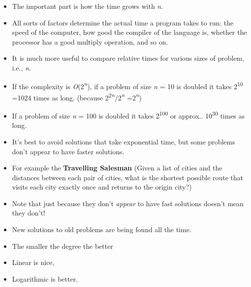 \documentclass{beamer}
\begin{document}
\begin{frame}
\begin{itemize}
\item The important part is how the time grows with \textit{n}.
\item All sorts of factors determine the actual time a program takes to run: the speed of the computer, how good the
compiler of the language is, whether the processor has a good multiply operation, and so on.
\item It is much more useful to compare relative times for various sizes of problem, i.e., \textit{n}.
\item If the complexity is \textit{O}(2\textit{\textsuperscript{n}}), if a problem of size \textit{n }= 10 is doubled it takes 2\textsuperscript{10 }=1024 times as long. 
(because 2\textsuperscript{2}\textit{\textsuperscript{n}}/2\textit{\textsuperscript{n }}=2\textit{\textsuperscript{n}})  
\item If a problem of size \textit{n }= 100 is doubled it takes 2\textsuperscript{100 }or approx.. 10\textsuperscript{30
}times as long.
\end{itemize}
\end{frame} 

\begin{frame}
\begin{itemize}
\item It's best to avoid solutions that take exponential time, but some problems don't appear to have faster solutions.
\item For example the \textbf{Travelling Salesman} (Given a list of cities and the distances between each pair of cities, what is the shortest possible route that visits each city exactly once and returns to the origin city?)
\item Note that just because they don't \textit{appear }to have fast solutions doesn't mean they don't!
\item New solutions to old problems are being found all the time.
\bigskip
\item The smaller the degree the better
\item Linear is nice, 
\item Logarithmic is better.
\end{itemize}
\end{frame} 
\end{document}
